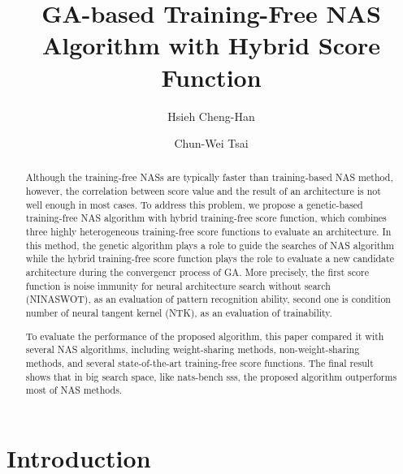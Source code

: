 \documentclass[sigconf]{acmart}
\begin{document}
\title{GA-based Training-Free NAS Algorithm with Hybrid Score Function}

\author{Hsieh Cheng-Han}

\author{Chun-Wei Tsai}

\begin{abstract}

    Although the training-free NASs are typically faster than training-based 
    NAS method, however, the correlation between score value and the result 
    of an architecture is not well enough in most cases.
    To address this problem, we propose a genetic-based training-free NAS 
    algorithm with hybrid training-free score function, which combines three 
    highly heterogeneous training-free score functions to evaluate an architecture. 
    In this method, the genetic algorithm plays a role to guide the searches 
    of NAS algorithm while the hybrid training-free score function plays the 
    role to evaluate a new candidate architecture during the convergencr process 
    of GA. More precisely, the first score function is noise immunity for 
    neural architecture search without search (NINASWOT), as an evaluation of 
    pattern recognition ability, second one is condition number of neural 
    tangent kernel (NTK), as an evaluation of trainability. 
    
    To evaluate the performance of the proposed algorithm, this paper compared 
    it with several NAS algorithms, including weight-sharing methods, 
    non-weight-sharing methods, and several state-of-the-art training-free score 
    functions. 
    The final result shows that in big search space, like nats-bench sss, the 
    proposed algorithm outperforms most of NAS methods. 

\end{abstract}
\maketitle

\section{Introduction}
\label{sec:introduction}
\end{document}
